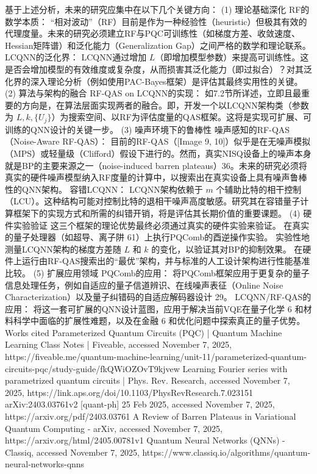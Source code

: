 \documentclass[12pt,a4paper]{article}
\begin{document}
基于上述分析，未来的研究应集中在以下几个关键方向：
(1) 理论基础深化
RF的数学本质： “相对波动”（RF）目前是作为一种经验性（heuristic）但极其有效的代理度量。未来的研究必须建立RF与PQC可训练性（如梯度方差、收敛速度、Hessian矩阵谱）和泛化能力（Generalization Gap）之间严格的数学和理论联系。
LCQNN的泛化界： LCQNN通过增加 $L$（即增加模型参数）来提高可训练性。这是否会增加模型的有效维度或复杂度，从而损害其泛化能力（即过拟合）？对其泛化界的深入理论分析（例如使用PAC-Bayes框架）是评估其最终实用性的关键。
(2) 算法与架构的融合
RF-QAS on LCQNN的实现： 如7.2节所详述，立即且最重要的方向是，在算法层面实现两者的融合。即，开发一个以LCQNN架构类（参数为 $L, k, \{U_j\}$）为搜索空间、以RF为评估度量的QAS框架。这将是实现可扩展、可训练的QNN设计的关键一步。
(3) 噪声环境下的鲁棒性
噪声感知的RF-QAS（Noise-Aware RF-QAS）： 目前的RF-QAS（[Image 9, 10]）似乎是在无噪声模拟（MPS）或轻量级（Clifford）假设下进行的。然而，真实NISQ设备上的噪声本身就是BP的主要来源之一（noise-induced barren plateaus）36。未来的研究必须将真实的硬件噪声模型纳入RF度量的计算中，以搜索出在真实设备上具有噪声鲁棒性的QNN架构。
容错LCQNN： LCQNN架构依赖于 $m$ 个辅助比特的相干控制（LCU）。这种结构可能对控制比特的退相干噪声高度敏感。研究其在容错量子计算框架下的实现方式和所需的纠错开销，将是评估其长期价值的重要课题。
(4) 硬件实验验证
这三个框架的理论优势最终必须通过真实的硬件实验来验证。
在真实的量子处理器（如超导、离子阱 61）上执行PQComb的酉逆操作实验。
实验性地测量LCQNN架构的梯度方差随 $L$ 和 $k$ 的变化，以验证其对BP的抑制效果。
在硬件上运行由RF-QAS搜索出的“最优”架构，并与标准的人工设计架构进行性能基准比较。
(5) 扩展应用领域
PQComb的应用： 将PQComb框架应用于更复杂的量子信息处理任务，例如自适应的量子信道辨识、在线噪声表征（Online Noise Characterization）以及量子纠错码的自适应解码器设计 29。
LCQNN/RF-QAS的应用： 将这一套可扩展的QNN设计蓝图，应用于解决当前VQE在量子化学 6 和材料科学中面临的扩展性难题，以及在金融 6 和优化问题中探索真正的量子优势。
Works cited
Parameterized Quantum Circuits (PQC) | Quantum Machine Learning Class Notes | Fiveable, accessed November 7, 2025, https://fiveable.me/quantum-machine-learning/unit-11/parameterized-quantum-circuits-pqc/study-guide/fkQWiOZOvT9kjvew
Learning Fourier series with parametrized quantum circuits | Phys. Rev. Research, accessed November 7, 2025, https://link.aps.org/doi/10.1103/PhysRevResearch.7.023151
arXiv:2403.03761v2 [quant-ph] 25 Feb 2025, accessed November 7, 2025, https://arxiv.org/pdf/2403.03761
A Review of Barren Plateaus in Variational Quantum Computing - arXiv, accessed November 7, 2025, https://arxiv.org/html/2405.00781v1
Quantum Neural Networks (QNNs) - Classiq, accessed November 7, 2025, https://www.classiq.io/algorithms/quantum-neural-networks-qnns
\end{document}
